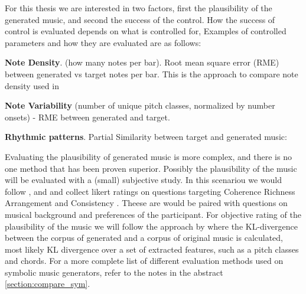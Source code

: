 For this thesis we are interested in two factors, first the plausibility of the generated music, and second the success of the control. How the success of control is evaluated depends on what is controlled for,  Examples of controlled parameters and how they are evaluated are as follows:

\textbf{Note Density}.  (how many notes per bar). Root mean square error (RME) between generated vs target notes per bar. This is the approach to compare note density used in \cite{Rütte_figaro_2023}

\textbf{Note Variability} (number of unique pitch classes, normalized by number onsets) - RME between generated and target.

\textbf{Rhythmic patterns}. Partial Similarity \cite{Volk_Garbers_VanKranenburg_Wiering_Grijp_Veltkamp_2009} between target and generated music: 

Evaluating the plausibility of generated music is more complex, and there is no one method that has been proven superior. Possibly the plausibility of the music will be evaluated with a (small) subjective study. In this scenariou we would follow \cite{Dong_Chen_MMT_Kirkpatrick_2023}, \cite{Yu_Lu_Wang_Hu_Tan_Ye_Zhang_museformer_2022} and \cite{Chen_Smith_Spijkervet_Wang_Zou_Li_Kong_Du_2024} and collect likert ratings on questions targeting Coherence Richness Arrangement and Consistency . Theese are would be paired with questions on musical background and preferences of the participant. 
For objective rating of the plausibility of the music we will follow the approach by \cite{Min_Jiang_Xia_Zhao_polyffusion_2023} where the KL-divergence between the corpus of generated and a corpus of original music is calculated, most likely KL divergence over a set of extracted features, such as a pitch classes and chords. For a more complete list of different evaluation methods used on symbolic music generators, refer to the notes in the abstract \ref{section:compare_sym}.
